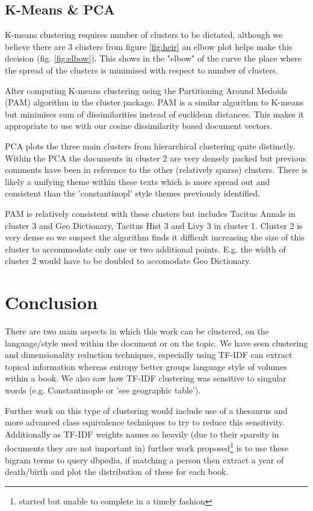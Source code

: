 \documentclass{sig-alternate-05-2015}
\begin{document}
\subsection{K-Means \& PCA}
K-means clustering requires number of clusters to be dictated, although we believe there are 3 clusters from figure \ref{fig:heir} an elbow plot helps make this decision (fig. \ref{fig:elbow}). This shows in the "elbow" of the curve the place where the spread of the clusters is minimised with respect to number of clusters.  

After computing K-means clustering using the Partitioning Around Medoids (PAM) algorithm in the cluster package\cite{kaufmanpj}\cite{cluster}. PAM is a similar algorithm to K-means but minimises sum of dissimilarities instead of euclidean distances. This makes it appropriate to use with our cosine dissimilarity based document vectors. 

PCA plots the three main clusters from hierarchical clustering quite distinctly. Within the PCA the documents in cluster 2 are very densely packed but previous comments have been in reference to the other (relatively sparse) clusters. There is likely a unifying theme within these texts which is more spread out and consistent than the 'constantinopl' style themes previously identified. 

PAM is relatively consistent with these clusters but includes Tacitus Annals in cluster 3 and Geo Dictionary, Tacitus Hist 3 and Livy 3 in cluster 1. Cluster 2 is very dense so we suspect the algorithm finds it difficult increasing the size of this cluster to accommodate only one or two additional points. E.g. the width of cluster 2 would have to be doubled to accomodate Geo Dictionary. 
\section{Conclusion}
There are two main aspects in which this work can be clustered, on the language/style used within the document or on the topic. We have seen clustering and dimensionality reduction techniques, especially using TF-IDF can extract topical information whereas entropy better groups language style of volumes within a book. We also saw how TF-IDF clustering was sensitive to singular words (e.g. Constantinople or 'see geographic table'). 


Further work on this type of clustering would include use of a thesaurus and more advanced class equivalence techniques to try to reduce this sensitivity. Additionally as TF-IDF weights names so heavily (due to their sparsity in documents they are not important in) further work proposed\footnote{started but unable to complete in a timely fashion} is to use these bigram terms to query dbpedia, if matching a person then extract a year of death/birth and plot the distribution of these for each book.
\end{document}
